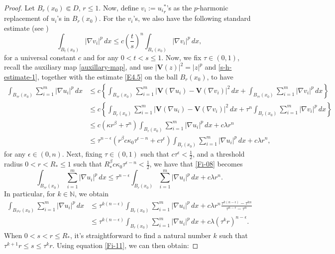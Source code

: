 \documentclass{amsart}
\begin{document}
\begin{proof}
Let $B_{r}(x_0) \Subset D$, $r \leq 1$.
Now, define $v_i:={u_i}^{*}_r$'s as the $p$-harmonic replacement of $u_i$'s in $B_r(x_0)$. 
For the $v_i$'s, we also have the following standard estimate (see \cite[Lemma 5.8]{diening2009everywhere})
\begin{equation}
\label{s-h-estimate-1}
\int_{B_t(x_0)}  |\nabla v_i|^p \, dx \leq c \left(\frac{t}{s} \right)^n \int_{B_s(x_0)} |\nabla v_i |^p \, dx,
\end{equation}
for a universal constant $c$ and for any $0<t<s \leq 1$. Now, we fix $\tau \in (0,1)$, recall the auxiliary map \eqref{auxillary-map}, and use $ |\mathbf{V}(z)|^2 = |z|^p $ and \eqref{s-h-estimate-1}, together with the estimate \eqref{E4.5} on the ball $B_r(x_0)$, to have
\begin{align} \nonumber
\int_{B_{ \tau r}(x_0)} \sum_{i=1}^{m} |\nabla u_i|^p \, dx & \leq c \left\{ \int_{B_{\tau r}(x_0)} \sum_{i=1}^{m} \left|\mathbf{V}(\nabla u_i) - \mathbf{V}(\nabla v_i) \right|^2 \, dx + \int_{B_{ \tau r}(x_0)} \sum_{i=1}^{m} |\nabla v_i|^p \, dx \right\} \\ \nonumber
& \leq c \left\{ \int_{B_r(x_0)} \sum_{i=1}^{m} \left|\mathbf{V}(\nabla u_i) - \mathbf{V}(\nabla v_i) \right|^2 \, dx + \tau^n \int_{B_r(x_0)} \sum_{i=1}^{m} |\nabla v_i|^p \, dx \right\} \\ \nonumber
& \leq c \left( \kappa r^{\beta}  + \tau^n \right) \int_{B_{r}(x_0)} \sum_{i=1}^{m} |\nabla u_i |^p \, dx + c \lambda r^n \\ \label{Fi-08}
& \leq \tau^{n-\epsilon} \left( r^{\beta} c \kappa_0  \tau^{ \epsilon -n}  + c \tau^{\epsilon} \right) \int_{B_{r}(x_0)} \sum_{i=1}^{m} |\nabla u_i |^p \, dx + c \lambda r^n ,
\end{align}
for any $\epsilon \in (0,n)$.
Next, fixing  $\tau \in (0,1)$ such that $c \tau^{\epsilon} < \frac{1}{2}$, and a threshold radius $0<r<R_* \leq 1$ such that $R_*^{\beta} c \kappa_0 \tau^{\epsilon-n}<\frac{1}{2}$, we have that  \eqref{Fi-08} becomes
$$
\int_{B_{\tau r}(x_0)} \sum_{i=1}^{m} |\nabla u_i|^p \, dx \leq \tau^{n-\epsilon} \int_{B_{r}(x_0)} \sum_{i=1}^{m} |\nabla u_i|^p \, dx + c \lambda r^n.
$$
In particular, for $k \in \mathbb{N}$, we obtain 
\begin{align} \nonumber
 \int_{B_{\tau^k r}(x_0)} \sum_{i=1}^{m} |\nabla u_i |^p \, dx& \leq \tau^{k(n-\epsilon)} \int_{B_{r}(x_0)} \sum_{i=1}^{m} |\nabla u_i|^p \, dx + c \lambda r^n  \frac{\tau^{k(n-\epsilon)}-\tau^{kn}}{\tau^{n-\epsilon}-\tau^{n}} \\ \label{Fi-11}
&\leq \tau^{k(n-\epsilon)} \int_{B_{r}(x_0)} \sum_{i=1}^{m} |\nabla u_i|^p \, dx + c \lambda \left(\tau^k r \right)^{n-\epsilon} .   
\end{align} 
When $0 < s < r \leq R_*$, it's straightforward to find a natural number $k$ such that 
$\tau^{k+1} r \leq s \leq \tau^k r$. Using equation \eqref{Fi-11}, we can then obtain:



\end{proof}
\end{document}
